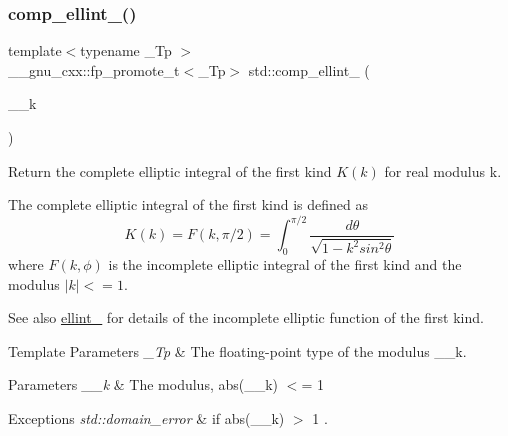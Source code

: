 \mbox{\label{group__mathsf__std_gad559217fb01e7a8b7a6e23eeedda64be}} 
\subsubsection{\texorpdfstring{comp\+\_\+ellint\+\_()}{comp\_ellint\_1()}}
{\footnotesize\ttfamily template$<$typename \+\_\+\+Tp $>$ \\
\+\_\+\+\_\+gnu\+\_\+cxx\+::fp\+\_\+promote\+\_\+t$<$\+\_\+\+Tp$>$ std\+::comp\+\_\+ellint\+\_ (\begin{DoxyParamCaption}\item[{\+\_\+\+Tp}]{\+\_\+\+\_\+k }\end{DoxyParamCaption})\hspace{0.3cm}{\ttfamily [inline]}}

Return the complete elliptic integral of the first kind $ K(k) $ for real modulus {\ttfamily k}.

The complete elliptic integral of the first kind is defined as \[ K(k) = F(k,\pi/2) = \int_0^{\pi/2}\frac{d\theta} {\sqrt{1 - k^2 sin^2\theta}} \] where $ F(k,\phi) $ is the incomplete elliptic integral of the first kind and the modulus $ |k| <= 1 $. \begin{DoxySeeAlso}{See also}
\hyperlink{group__mathsf__std_ga1550d6947bbbeee9865aabd398102a36}{ellint\+\_} for details of the incomplete elliptic function of the first kind.
\end{DoxySeeAlso}

\begin{DoxyTemplParams}{Template Parameters}
{\em \+\_\+\+Tp} & The floating-\/point type of the modulus {\ttfamily \+\_\+\+\_\+k}. \\
\hline
\end{DoxyTemplParams}

\begin{DoxyParams}{Parameters}
{\em \+\_\+\+\_\+k} & The modulus, {\ttfamily  abs(\+\_\+\+\_\+k) $<$= 1 } \\
\hline
\end{DoxyParams}

\begin{DoxyExceptions}{Exceptions}
{\em std\+::domain\+\_\+error} & if {\ttfamily  abs(\+\_\+\+\_\+k) $>$ 1 }. \\
\hline
\end{DoxyExceptions}


